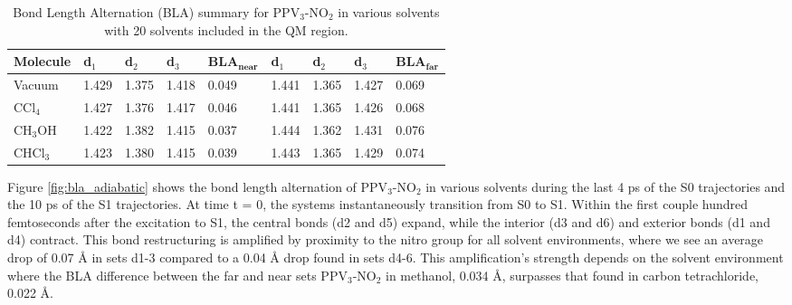     \begin{table}[H]
      \caption[Adiabatic bond length alternation]{Bond Length Alternation (BLA) summary for PPV\(_3\)-NO\(_2\) in various solvents with 20 solvents included in the QM region.} \label{tab:adiabaticBLA}
      \begin{tabularx}{\textwidth}{XXXXXXXXX}\hline
        Molecule   & d\(_1\)  & d\(_2\) & d\(_3\) & BLA\(_{\textbf{near}}\) & d\(_1\)  & d\(_2\) & d\(_3\) & BLA\(_{\textbf{far}}\)\\\hline
        Vacuum     & 1.429     & 1.375    & 1.418    & 0.049              & 1.441     & 1.365    & 1.427   & 0.069\\
        CCl\(_4\)  & 1.427     & 1.376    & 1.417    & 0.046              & 1.441     & 1.365    & 1.426   & 0.068\\
        CH\(_3\)OH & 1.422     & 1.382    & 1.415    & 0.037              & 1.444     & 1.362    & 1.431   & 0.076\\
        CHCl\(_3\) & 1.423     & 1.380    & 1.415    & 0.039              & 1.443     & 1.365    & 1.429   & 0.074\\\hline
      \end{tabularx}
    \end{table}

    Figure \ref{fig:bla_adiabatic} shows the bond length alternation of
    PPV\(_3\)-NO\(_2\) in various solvents during the last 4 ps of the S0 trajectories and the 10 ps of the S1 trajectories. At time t = 0, the systems instantaneously transition from S0 to S1.
    Within the first couple hundred femtoseconds after the
    excitation to S1, the central bonds (d2 and d5) expand, while the interior (d3 and d6) and
    exterior bonds (d1 and d4)  contract.  This bond restructuring is amplified by
    proximity to the nitro group for all solvent environments, where we
    see an average drop of 0.07 Å in sets d1-3 compared to a 0.04 Å drop
    found in sets d4-6.  This amplification's strength depends on the
    solvent environment where the BLA difference between the far and near
    sets PPV\(_3\)-NO\(_2\) in methanol, 0.034 Å, surpasses that found in carbon
    tetrachloride, 0.022 Å.

